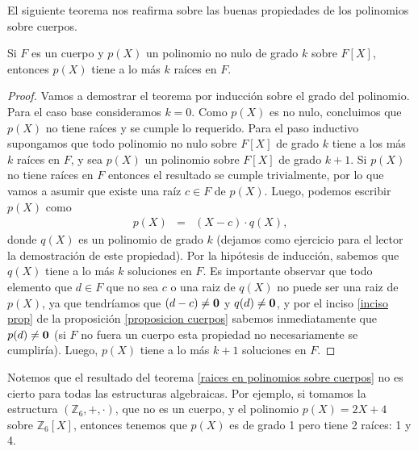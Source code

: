 El siguiente teorema nos reafirma sobre las buenas propiedades de los polinomios sobre cuerpos.
\begin{theorem}\label{raices en polinomios sobre cuerpos}
Si $F$ es un cuerpo y $p(X)$ un polinomio no nulo de grado $k$ sobre $F[X]$, entonces $p(X)$ tiene a lo más $k$ raíces en $F$.
\end{theorem}
\begin{proof}
Vamos a demostrar el teorema por inducción sobre el grado del
polinomio. Para el caso base consideramos $k=0$. Como $p(X)$ es no
nulo, concluimos que $p(X)$ no tiene raíces y se cumple lo
requerido. Para el paso inductivo supongamos que todo polinomio no
nulo sobre $F[X]$ de grado $k$ tiene a los más $k$ raíces en $F$, y
sea $p(X)$ un polinomio sobre $F[X]$ de grado $k+1$. Si $p(X)$ no
tiene raíces en $F$ entonces el resultado se cumple trivialmente, por
lo que vamos a asumir que existe una raíz $c \in F$ de
$p(X)$. Luego, podemos escribir $p(X)$ como
\begin{eqnarray*}
p(X) & = & (X-c)\cdot q(X),
\end{eqnarray*}
donde $q(X)$ es un polinomio de grado $k$ (dejamos como ejercicio para
el lector la demostración de este propiedad).
Por la hipótesis de inducción, sabemos que $q(X)$ tiene a lo más $k$
soluciones en $F$. Es importante observar que todo elemento que $d\in
F$ que no sea $c$ o una raiz de $q(X)$ no puede ser una raiz de
$p(X)$, ya que tendríamos que $(d-c)\neq \mathbf{0}$ y $q(d)\neq \mathbf{0}$, y por el
inciso \ref{inciso prop} de la proposición \ref{proposicion cuerpos}
sabemos inmediatamente que $p(d)\neq\mathbf{0}$ (si $F$ no fuera un cuerpo
esta propiedad no necesariamente se cumpliría).  Luego, $p(X)$ tiene a
lo más $k+1$ soluciones en $F$.
\end{proof}
Notemos que el resultado del teorema \ref{raices en polinomios sobre
cuerpos} no es cierto para todas las estructuras algebraicas. Por
ejemplo, si tomamos la estructura $(\mathbb{Z}_6,+,\cdot)$, que no es
un cuerpo, y el polinomio $p(X) = 2X+4$ sobre $\mathbb{Z}_6[X]$,
entonces tenemos que $p(X)$ es de grado 1 pero tiene 2 raíces: 1 y 4.

